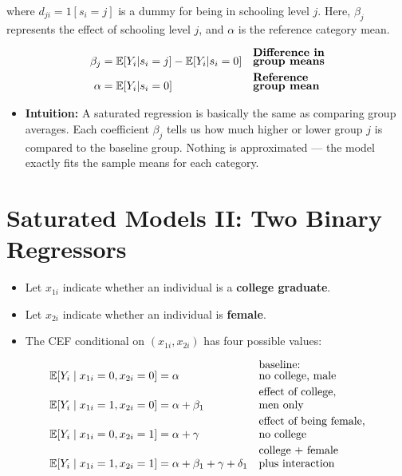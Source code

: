 \documentclass[12pt]{article}
\begin{document}
\noindent where $d_{ji} = 1[s_i=j]$ is a dummy for being in schooling level $j$.  
Here, $\beta_j$ represents the effect of schooling level $j$, and $\alpha$ is the reference category mean.  

\begin{align}
\beta_j &= \mathbb{E}[Y_i|s_i=j] - \mathbb{E}[Y_i|s_i=0] && \text{\shortstack[l]{\textbf{Difference in} \\ \textbf{group means}}} \\
\alpha  &= \mathbb{E}[Y_i|s_i=0] && \text{\shortstack[l]{\textbf{Reference} \\ \textbf{group mean}}}
\end{align}

\begin{itemize}
    \item \textbf{Intuition:} A saturated regression is basically the same as comparing group averages. Each coefficient $\beta_j$ tells us how much higher or lower group $j$ is compared to the baseline group. Nothing is approximated — the model exactly fits the sample means for each category.
\end{itemize}

\section*{\noindent\textbf{Saturated Models II: Two Binary Regressors}}

\begin{itemize}
    \item Let $x_{1i}$ indicate whether an individual is a \textbf{college graduate}.  
    \item Let $x_{2i}$ indicate whether an individual is \textbf{female}.  
    \item The CEF conditional on $(x_{1i},x_{2i})$ has four possible values:
\end{itemize}

\singlespacing
\begin{align}
\mathbb{E}[Y_i \mid x_{1i}=0, x_{2i}=0] &= \alpha && \text{\shortstack[l]{baseline: \\ no college, male}} \\
\mathbb{E}[Y_i \mid x_{1i}=1, x_{2i}=0] &= \alpha + \beta_1 && \text{\shortstack[l]{effect of college, \\ men only}} \\
\mathbb{E}[Y_i \mid x_{1i}=0, x_{2i}=1] &= \alpha + \gamma && \text{\shortstack[l]{effect of being female, \\ no college}} \\
\mathbb{E}[Y_i \mid x_{1i}=1, x_{2i}=1] &= \alpha + \beta_1 + \gamma + \delta_1 && \text{\shortstack[l]{college + female \\ plus interaction}}
\end{align}
\end{document}
